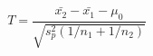 \documentclass[10pt]{article}
\begin{document}
\[T=\frac{\bar{x_2}-\bar{x_1}-\mu_0}{\sqrt{s_p^2(1/n_1+1/n_2)}}
\]
\end{document}

